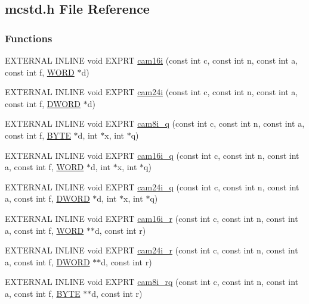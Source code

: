 \subsection{mcstd.h File Reference}
\label{mcstd_8h}
\subsubsection*{Functions}
\begin{DoxyCompactItemize}
\item 
EXTERNAL INLINE void EXPRT \hyperlink{group__mcstdfunctionh_gad17f339ee8254f1aad6b406e50ebd4a8}{cam16i} (const int c, const int n, const int a, const int f, \hyperlink{vt2_8h_a2b0e863dadf920709ec53d9088ee7c91}{WORD} $\ast$d)
\item 
EXTERNAL INLINE void EXPRT \hyperlink{group__mcstdfunctionh_ga84d45a99ef748664e1eead0a5da4d862}{cam24i} (const int c, const int n, const int a, const int f, \hyperlink{vt2_8h_a798af1e30bc65f319c1a246cecf59e39}{DWORD} $\ast$d)
\item 
EXTERNAL INLINE void EXPRT \hyperlink{group__mcstdfunctionh_gad21ad710943e2ab5df6f8e609afeebfe}{cam8i\_\-q} (const int c, const int n, const int a, const int f, \hyperlink{vt2_8h_a4ae1dab0fb4b072a66584546209e7d58}{BYTE} $\ast$d, int $\ast$x, int $\ast$q)
\item 
EXTERNAL INLINE void EXPRT \hyperlink{group__mcstdfunctionh_ga2a515796e8020af32ea0e5aad490a170}{cam16i\_\-q} (const int c, const int n, const int a, const int f, \hyperlink{vt2_8h_a2b0e863dadf920709ec53d9088ee7c91}{WORD} $\ast$d, int $\ast$x, int $\ast$q)
\item 
EXTERNAL INLINE void EXPRT \hyperlink{group__mcstdfunctionh_ga0f1b4435d6f1fea0e5787a5c2388b41c}{cam24i\_\-q} (const int c, const int n, const int a, const int f, \hyperlink{vt2_8h_a798af1e30bc65f319c1a246cecf59e39}{DWORD} $\ast$d, int $\ast$x, int $\ast$q)
\item 
EXTERNAL INLINE void EXPRT \hyperlink{group__mcstdfunctionh_ga2c3c3cdd300fee9d03e3c426dad38e7c}{cam16i\_\-r} (const int c, const int n, const int a, const int f, \hyperlink{vt2_8h_a2b0e863dadf920709ec53d9088ee7c91}{WORD} $\ast$$\ast$d, const int r)
\item 
EXTERNAL INLINE void EXPRT \hyperlink{group__mcstdfunctionh_gafe207e922a73f0b30e290e830808ec61}{cam24i\_\-r} (const int c, const int n, const int a, const int f, \hyperlink{vt2_8h_a798af1e30bc65f319c1a246cecf59e39}{DWORD} $\ast$$\ast$d, const int r)
\item 
EXTERNAL INLINE void EXPRT \hyperlink{group__mcstdfunctionh_ga0b43ea9b407515f2cd75fb68f0d07e39}{cam8i\_\-rq} (const int c, const int n, const int a, const int f, \hyperlink{vt2_8h_a4ae1dab0fb4b072a66584546209e7d58}{BYTE} $\ast$$\ast$d, const int r)
$$
\end{DoxyCompactItemize}
